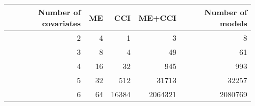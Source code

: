 \begin{table}[!h]
\centering
\caption{} 
\begin{tabular}{rrrrr}
  \hline
Number of covariates & ME & CCI & ME+CCI & Number of models \\ 
  \hline
2 & 4 & 1 & 3 & 8 \\ 
  3 & 8 & 4 & 49 & 61 \\ 
  4 & 16 & 32 & 945 & 993 \\ 
  5 & 32 & 512 & 31713 & 32257 \\ 
  6 & 64 & 16384 & 2064321 & 2080769 \\ 
   \hline
\end{tabular}
\end{table}
